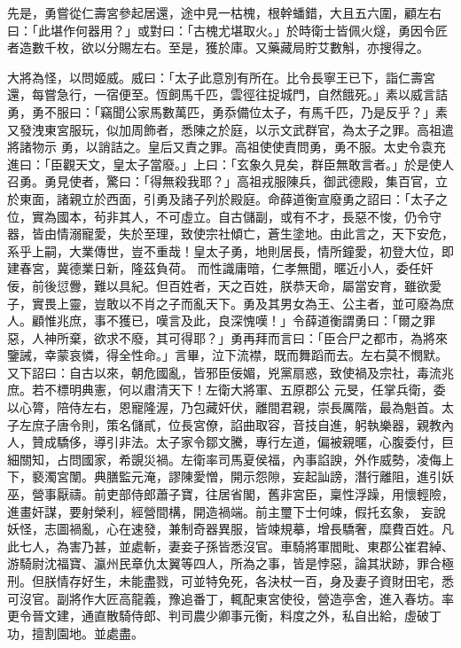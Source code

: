 \begin{pinyinscope}
 先是，勇嘗從仁壽宮參起居還，途中見一枯槐，根幹蟠錯，大且五六圍，顧左右曰：「此堪作何器用？」或對曰：「古槐尤堪取火。」於時衛士皆佩火燧，勇因令匠者造數千枚，欲以分賜左右。至是，獲於庫。又藥藏局貯艾數斛，亦搜得之。



 大將為怪，以問姬威。威曰：「太子此意別有所在。比令長寧王已下，詣仁壽宮還，每嘗急行，一宿便至。恆飼馬千匹，雲徑往捉城門，自然餓死。」素以威言詰勇，勇不服曰：「竊聞公家馬數萬匹，勇忝備位太子，有馬千匹，乃是反乎？」素又發洩東宮服玩，似加周飾者，悉陳之於庭，以示文武群官，為太子之罪。高祖遣將諸物示
 勇，以誚詰之。皇后又責之罪。高祖使使責問勇，勇不服。太史令袁充進曰：「臣觀天文，皇太子當廢。」上曰：「玄象久見矣，群臣無敢言者。」於是使人召勇。勇見使者，驚曰：「得無殺我耶？」高祖戎服陳兵，御武德殿，集百官，立於東面，諸親立於西面，引勇及諸子列於殿庭。命薛道衡宣廢勇之詔曰：「太子之位，實為國本，茍非其人，不可虛立。自古儲副，或有不才，長惡不悛，仍令守器，皆由情溺寵愛，失於至理，致使宗社傾亡，蒼生塗地。由此言之，天下安危，系乎上嗣，大業傳世，豈不重哉！皇太子勇，地則居長，情所鐘愛，初登大位，即建春宮，冀德業日新，隆茲負荷。
 而性識庸暗，仁孝無聞，暱近小人，委任奸佞，前後愆釁，難以具紀。但百姓者，天之百姓，朕恭天命，屬當安育，雖欲愛子，實畏上靈，豈敢以不肖之子而亂天下。勇及其男女為王、公主者，並可廢為庶人。顧惟兆庶，事不獲已，嘆言及此，良深愧嘆！」令薛道衡謂勇曰：「爾之罪惡，人神所棄，欲求不廢，其可得耶？」勇再拜而言曰：「臣合尸之都市，為將來鑒誡，幸蒙哀憐，得全性命。」言畢，泣下流襟，既而舞蹈而去。左右莫不憫默。又下詔曰：自古以來，朝危國亂，皆邪臣佞媚，兇黨扇惑，致使禍及宗社，毒流兆庶。若不標明典憲，何以肅清天下！左衛大將軍、五原郡公
 元旻，任掌兵衛，委以心膂，陪侍左右，恩寵隆渥，乃包藏奸伏，離間君親，崇長厲階，最為魁首。太子左庶子唐令則，策名儲貳，位長宮僚，諂曲取容，音技自進，躬執樂器，親教內人，贊成驕侈，導引非法。太子家令鄒文騰，專行左道，偏被親暱，心腹委付，巨細關知，占問國家，希覬災禍。左衛率司馬夏侯福，內事諂諛，外作威勢，凌侮上下，褻濁宮闈。典膳監元淹，謬陳愛憎，開示怨隙，妄起訕謗，潛行離阻，進引妖巫，營事厭禱。前吏部侍郎蕭子寶，往居省閣，舊非宮臣，稟性浮躁，用懷輕險，進畫奸謀，要射榮利，經營間構，開造禍端。前主璽下士何竦，假托玄象，
 妄說妖怪，志圖禍亂，心在速發，兼制奇器異服，皆竦規摹，增長驕奢，糜費百姓。凡此七人，為害乃甚，並處斬，妻妾子孫皆悉沒官。車騎將軍閻毗、東郡公崔君綽、游騎尉沈福寶、瀛州民章仇太翼等四人，所為之事，皆是悖惡，論其狀跡，罪合極刑。但朕情存好生，未能盡戮，可並特免死，各決杖一百，身及妻子資財田宅，悉可沒官。副將作大匠高龍義，豫追番丁，輒配東宮使役，營造亭舍，進入春坊。率更令晉文建，通直散騎侍郎、判司農少卿事元衡，料度之外，私自出給，虛破丁功，擅割園地。並處盡。




\end{pinyinscope}
